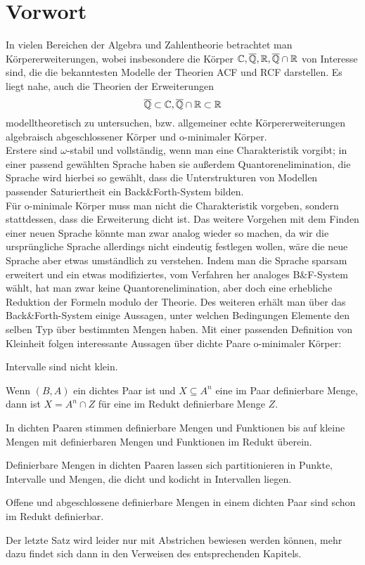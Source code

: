 \chapter*{Vorwort}
In vielen Bereichen der Algebra und Zahlentheorie betrachtet man Körpererweiterungen, wobei insbesondere die Körper $\mathbb{C},\overline{\mathbb{Q}},\mathbb{R},\overline{\mathbb{Q}}\cap\mathbb{R}$ von Interesse sind, die die bekanntesten Modelle der Theorien ACF und RCF darstellen. Es liegt nahe, auch die Theorien der Erweiterungen $$\overline{\mathbb{Q}}\subset\mathbb{C},\overline{\mathbb{Q}}\cap\mathbb{R}\subset\mathbb{R}$$ modelltheoretisch zu untersuchen, bzw. allgemeiner echte Körpererweiterungen algebraisch abgeschlossener Körper und o-minimaler Körper.\\
Erstere sind $\omega$-stabil und vollständig, wenn man eine Charakteristik vorgibt; in einer passend gewählten Sprache haben sie außerdem Quantorenelimination, die Sprache wird hierbei so gewählt, dass die Unterstrukturen von Modellen passender Saturiertheit ein Back\&Forth-System bilden.\\
Für o-minimale Körper muss man nicht die Charakteristik vorgeben, sondern stattdessen, dass die Erweiterung dicht ist. Das weitere Vorgehen mit dem Finden einer neuen Sprache könnte man zwar analog wieder so machen, da wir die ursprüngliche Sprache allerdings nicht eindeutig festlegen wollen, wäre die neue Sprache aber etwas umständlich zu verstehen. Indem man die Sprache sparsam erweitert und ein etwas modifiziertes, vom Verfahren her analoges B\&F-System wählt, hat man zwar keine Quantorenelimination, aber doch eine erhebliche Reduktion der Formeln modulo der Theorie. Des weiteren erhält man über das Back\&Forth-System einige Aussagen, unter welchen Bedingungen Elemente den selben Typ über bestimmten Mengen haben. Mit einer passenden Definition von Kleinheit folgen interessante Aussagen über dichte Paare o-minimaler Körper:
\begin{satzleer}
	Intervalle sind nicht klein.
\end{satzleer}

\begin{satzleer}
	Wenn $(B,A)$ ein dichtes Paar ist und $X\subseteq A^n$ eine im Paar definierbare Menge, dann ist $X=A^n\cap Z$ für eine im Redukt definierbare Menge $Z$.
\end{satzleer}

\begin{satzleer}
	In dichten Paaren stimmen definierbare Mengen und Funktionen bis auf kleine Mengen mit definierbaren Mengen und Funktionen im Redukt überein.
\end{satzleer}

\begin{satzleer}
	Definierbare Mengen in dichten Paaren lassen sich partitionieren in Punkte, Intervalle und Mengen, die dicht und kodicht in Intervallen liegen.
\end{satzleer}

\begin{satzleer}
	Offene und abgeschlossene definierbare Mengen in einem dichten Paar sind schon im Redukt definierbar.
\end{satzleer}

Der letzte Satz wird leider nur mit Abstrichen bewiesen werden können, mehr dazu findet sich dann in den Verweisen des entsprechenden Kapitels.